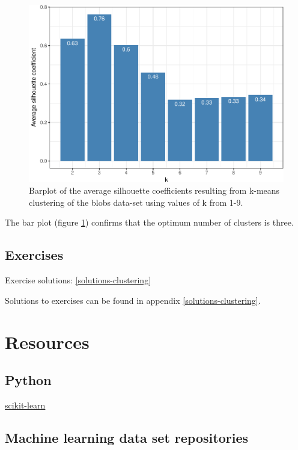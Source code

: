 \documentclass[]{book}
\theoremstyle{definition}
\theoremstyle{definition}
\theoremstyle{definition}
\theoremstyle{remark}
\begin{document}
\begin{figure}

{\centering \includegraphics[width=0.75\linewidth]{09-clustering_files/figure-latex/silhouetteAllK-1} 

}

\caption{Barplot of the average silhouette coefficients resulting from k-means clustering of the blobs data-set using values of k from 1-9.}\label{fig:silhouetteAllK}
\end{figure}

The bar plot (figure \ref{fig:silhouetteAllK}) confirms that the optimum
number of clusters is three.

\section{Exercises}\label{exercises-7}

Exercise solutions: \ref{solutions-clustering}

Solutions to exercises can be found in appendix
\ref{solutions-clustering}.

\appendix


\chapter{Resources}\label{resources}

\section{Python}\label{python}

\href{http://scikit-learn.org}{scikit-learn}

\section{Machine learning data set
repositories}\label{machine-learning-data-set-repositories}
\end{document}

